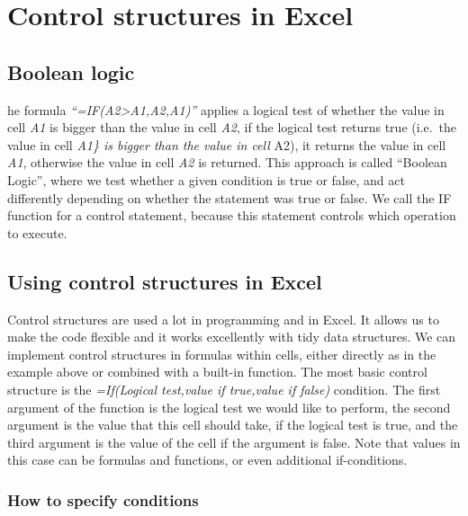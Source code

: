 \documentclass[]{book}
\begin{document}
\hypertarget{control-structures-in-excel}{%
\section{Control structures in Excel}\label{control-structures-in-excel}}

\hypertarget{boolean-logic}{%
\subsection{Boolean logic}\label{boolean-logic}}

he formula \emph{``=IF(A2\textgreater A1,A2,A1)''} applies a logical test of whether the value in cell \emph{A1} is bigger than the value in cell \emph{A2}, if the logical test returns true (i.e.~the value in cell \emph{A1\} is bigger than the value in cell }A2), it returns the value in cell \emph{A1}, otherwise the value in cell \emph{A2} is returned. This approach is called ``Boolean Logic'', where we test whether a given condition is true or false, and act differently depending on whether the statement was true or false. We call the IF function for a control statement, because this statement controls which operation to execute.

\hypertarget{using-control-structures-in-excel}{%
\subsection{Using control structures in Excel}\label{using-control-structures-in-excel}}

Control structures are used a lot in programming and in Excel. It allows us to make the code flexible and it works excellently with tidy data structures. We can implement control structures in formulas within cells, either directly as in the example above or combined with a built-in function. The most basic control structure is the \emph{=If(Logical test,value if true,value if false)} condition. The first argument of the function is the logical test we would like to perform, the second argument is the value that this cell should take, if the logical test is true, and the third argument is the value of the cell if the argument is false. Note that values in this case can be formulas and functions, or even additional if-conditions.

\hypertarget{how-to-specify-conditions}{%
\subsubsection*{How to specify conditions}\label{how-to-specify-conditions}}
\end{document}
